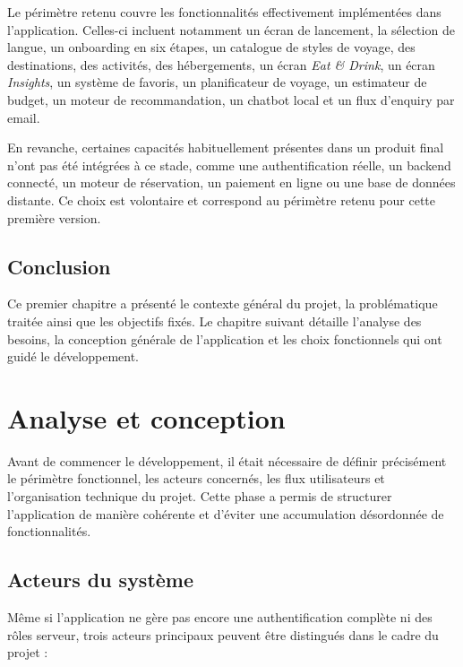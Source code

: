 \documentclass[12pt,a4paper]{report}
\begin{document}
Le périmètre retenu couvre les fonctionnalités effectivement implémentées dans l'application. Celles-ci incluent notamment un écran de lancement, la sélection de langue, un onboarding en six étapes, un catalogue de styles de voyage, des destinations, des activités, des hébergements, un écran \textit{Eat \& Drink}, un écran \textit{Insights}, un système de favoris, un planificateur de voyage, un estimateur de budget, un moteur de recommandation, un chatbot local et un flux d'enquiry par email.

En revanche, certaines capacités habituellement présentes dans un produit final n'ont pas été intégrées à ce stade, comme une authentification réelle, un backend connecté, un moteur de réservation, un paiement en ligne ou une base de données distante. Ce choix est volontaire et correspond au périmètre retenu pour cette première version.

\section*{Conclusion}

Ce premier chapitre a présenté le contexte général du projet, la problématique traitée ainsi que les objectifs fixés. Le chapitre suivant détaille l'analyse des besoins, la conception générale de l'application et les choix fonctionnels qui ont guidé le développement.

\chapter{Analyse et conception}

Avant de commencer le développement, il était nécessaire de définir précisément le périmètre fonctionnel, les acteurs concernés, les flux utilisateurs et l'organisation technique du projet. Cette phase a permis de structurer l'application de manière cohérente et d'éviter une accumulation désordonnée de fonctionnalités.

\section{Acteurs du système}

Même si l'application ne gère pas encore une authentification complète ni des rôles serveur, trois acteurs principaux peuvent être distingués dans le cadre du projet :
\end{document}
